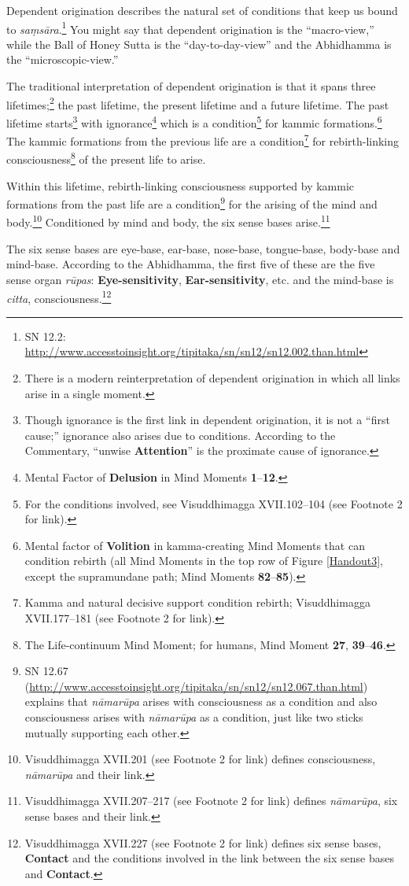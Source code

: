 Dependent origination describes the natural set of conditions that keep us bound to \textit{saṃsāra}.\footnote{SN 12.2: \url{http://www.accesstoinsight.org/tipitaka/sn/sn12/sn12.002.than.html}} You might say that dependent origination is the “macro-view,” while the Ball of Honey Sutta is the “day-to-day-view” and the Abhidhamma is the “microscopic-view.”

The traditional interpretation of dependent origination is that it spans three lifetimes;\footnote{There is a modern reinterpretation of dependent origination in which all links arise in a single moment.} the past lifetime, the present lifetime and a future lifetime. The past lifetime starts\footnote{Though ignorance is the first link in dependent origination, it is not a “first cause;” ignorance also arises due to conditions. According to the Commentary, “unwise \textbf{Attention}” is the proximate cause of ignorance.} with ignorance\footnote{Mental Factor of \textbf{Delusion} in Mind Moments \textbf{1}--\textbf{12}.} which is a condition\footnote{For the conditions involved, see Visuddhimagga XVII.102--104 (see Footnote 2 for link).} for kammic formations.\footnote{Mental factor of \textbf{Volition} in kamma-creating Mind Moments that can condition rebirth (all Mind Moments in the top row of Figure \ref{Handout3}, except the supramundane path; Mind Moments \textbf{82}--\textbf{85}).} The kammic formations from the previous life are a condition\footnote{Kamma and natural decisive support condition rebirth; Visuddhimagga XVII.177--181 (see Footnote 2 for link).} for rebirth-linking consciousness\footnote{The Life-continuum Mind Moment; for humans, Mind Moment \textbf{27}, \textbf{39}--\textbf{46}.} of the present life to arise.

Within this lifetime, rebirth-linking consciousness supported by kammic formations from the past life are a condition\footnote{SN 12.67 (\url{http://www.accesstoinsight.org/tipitaka/sn/sn12/sn12.067.than.html}) explains that \textit{nāmarūpa} arises with consciousness as a condition and also consciousness arises with \textit{nāmarūpa} as a condition, just like two sticks mutually supporting each other.} for the arising of the mind and body.\footnote{Visuddhimagga XVII.201 (see Footnote 2 for link) defines consciousness, \textit{nāmarūpa} and their link.} Conditioned by mind and body, the six sense bases arise.\footnote{Visuddhimagga XVII.207--217 (see Footnote 2 for link) defines \textit{nāmarūpa}, six sense bases and their link.}

The six sense bases are eye-base, ear-base, nose-base, tongue-base, body-base and mind-base. According to the Abhidhamma, the first five of these are the five sense organ \textit{rūpas}: \textbf{Eye-sensitivity}, \textbf{Ear-sensitivity}, etc. and the mind-base is \textit{citta}, consciousness.\footnote{Visuddhimagga XVII.227 (see Footnote 2 for link) defines six sense bases, \textbf{Contact} and the conditions involved in the link between the six sense bases and \textbf{Contact}.}

